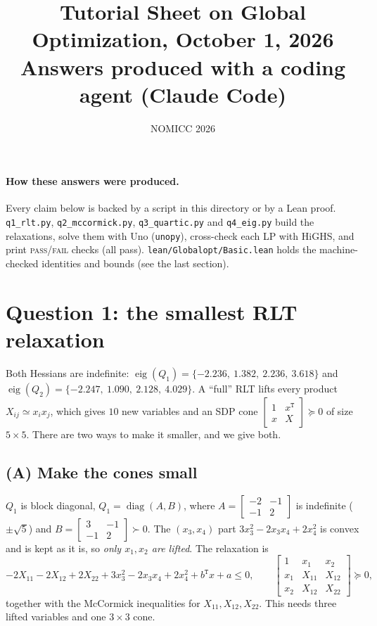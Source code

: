 \documentclass[11pt,fleqn]{article}
\title{Tutorial Sheet on Global Optimization, October 1, 2026\\[0.5ex]
  \large Answers produced with a coding agent (Claude Code)}
\author{NOMICC 2026}
\date{}
\newcommand{\trps}{^\texttt{T}}
\newcommand{\code}[1]{\texttt{#1}}
\begin{document}
\maketitle

\paragraph{How these answers were produced.}
Every claim below is backed by a script in this directory or by a Lean proof.
\code{q1\_rlt.py}, \code{q2\_mccormick.py}, \code{q3\_quartic.py} and \code{q4\_eig.py}
build the relaxations, solve them with Uno (\code{unopy}), cross-check each LP with
HiGHS, and print \textsc{pass}/\textsc{fail} checks (all pass). \code{lean/Globalopt/Basic.lean}
holds the machine-checked identities and bounds (see the last section).

\section*{Question 1: the smallest RLT relaxation}

Both Hessians are indefinite:
$\operatorname{eig}(Q_1) = \{-2.236,\ 1.382,\ 2.236,\ 3.618\}$ and
$\operatorname{eig}(Q_2) = \{-2.247,\ 1.090,\ 2.128,\ 4.029\}$.
A ``full'' RLT lifts every product $X_{ij} \simeq x_i x_j$, which gives $10$ new variables
and an SDP cone $\left[\begin{smallmatrix}1 & x\trps\\ x & X\end{smallmatrix}\right] \succeq 0$
of size $5\times 5$. There are two ways to make it smaller, and we give both.

\subsection*{(A) Make the cones small}

\textbf{$Q_1$} is block diagonal,
$Q_1 = \operatorname{diag}(A, B)$, where $A = \left[\begin{smallmatrix}-2&-1\\-1&2\end{smallmatrix}\right]$ is
indefinite ($\pm\sqrt5$) and $B = \left[\begin{smallmatrix}3&-1\\-1&2\end{smallmatrix}\right] \succ 0$.
The $(x_3,x_4)$ part $3x_3^2 - 2x_3x_4 + 2x_4^2$ is convex and is kept as it is, so
\emph{only $x_1, x_2$ are lifted}. The relaxation is
\[
  -2X_{11} - 2X_{12} + 2X_{22} + 3x_3^2 - 2x_3x_4 + 2x_4^2 + b\trps x + a \le 0,\qquad
  \begin{bmatrix} 1 & x_1 & x_2\\ x_1 & X_{11} & X_{12}\\ x_2 & X_{12} & X_{22}\end{bmatrix} \succeq 0,
\]
together with the McCormick inequalities for $X_{11}, X_{12}, X_{22}$. This needs three lifted
variables and one $3\times3$ cone.
\end{document}
